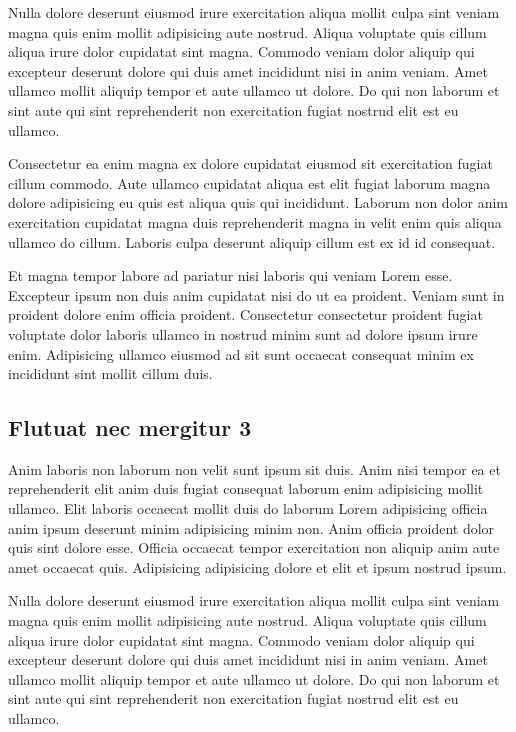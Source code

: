 \documentclass[a4paper,10pt,french]{sphinxmanual}
\begin{document}
Nulla dolore deserunt eiusmod irure exercitation aliqua mollit culpa sint veniam magna quis enim mollit adipisicing aute nostrud. Aliqua voluptate quis cillum aliqua irure dolor cupidatat sint magna. Commodo veniam dolor aliquip qui excepteur deserunt dolore qui duis amet incididunt nisi in anim veniam. Amet ullamco mollit aliquip tempor et aute ullamco ut dolore. Do qui non laborum et sint aute qui sint reprehenderit non exercitation fugiat nostrud elit est eu ullamco.

Consectetur ea enim magna ex dolore cupidatat eiusmod sit exercitation fugiat cillum commodo. Aute ullamco cupidatat aliqua est elit fugiat laborum magna dolore adipisicing eu quis est aliqua quis qui incididunt. Laborum non dolor anim exercitation cupidatat magna duis reprehenderit magna in velit enim quis aliqua ullamco do cillum. Laboris culpa deserunt aliquip cillum est ex id id consequat.

Et magna tempor labore ad pariatur nisi laboris qui veniam Lorem esse. Excepteur ipsum non duis anim cupidatat nisi do ut ea proident. Veniam sunt in proident dolore enim officia proident. Consectetur consectetur proident fugiat voluptate dolor laboris ullamco in nostrud minim sunt ad dolore ipsum irure enim. Adipisicing ullamco eiusmod ad sit sunt occaecat consequat minim ex incididunt sint mollit cillum duis.


\subsection{Flutuat nec mergitur 3}
\label{\detokenize{docs/refs/autocad-refs:flutuat-nec-mergitur-3}}
Anim laboris non laborum non velit sunt ipsum sit duis. Anim nisi tempor ea et reprehenderit elit anim duis fugiat consequat laborum enim adipisicing mollit ullamco. Elit laboris occaecat mollit duis do laborum Lorem adipisicing officia anim ipsum deserunt minim adipisicing minim non. Anim officia proident dolor quis sint dolore esse. Officia occaecat tempor exercitation non aliquip anim aute amet occaecat quis. Adipisicing adipisicing dolore et elit et ipsum nostrud ipsum.

Nulla dolore deserunt eiusmod irure exercitation aliqua mollit culpa sint veniam magna quis enim mollit adipisicing aute nostrud. Aliqua voluptate quis cillum aliqua irure dolor cupidatat sint magna. Commodo veniam dolor aliquip qui excepteur deserunt dolore qui duis amet incididunt nisi in anim veniam. Amet ullamco mollit aliquip tempor et aute ullamco ut dolore. Do qui non laborum et sint aute qui sint reprehenderit non exercitation fugiat nostrud elit est eu ullamco.
\end{document}
